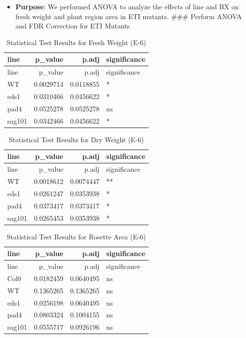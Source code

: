 \documentclass[
  10pt,
]{article}
\providecommand{\tightlist}{%
  \setlength{\itemsep}{0pt}\setlength{\parskip}{0pt}}\usepackage{longtable,booktabs,array}
\begin{document}
\begin{itemize}
\tightlist
\item
  \textbf{Purpose}: We performed ANOVA to analyze the effects of line
  and BX on fresh weight and plant region area in ETI mutants.
  \newpage \#\#\# Perform ANOVA and FDR Correction for ETI Mutants
\end{itemize}

\begin{longtable}[]{@{}lrrl@{}}
\caption{Statistical Test Results for Fresh Weight (E-6)}\tabularnewline
\toprule\noalign{}
line & p\_value & p.adj & significance \\
\midrule\noalign{}
\endfirsthead
\toprule\noalign{}
line & p\_value & p.adj & significance \\
\midrule\noalign{}
\endhead
\bottomrule\noalign{}
\endlastfoot
WT & 0.0029714 & 0.0118855 & * \\
eds1 & 0.0310466 & 0.0456622 & * \\
pad4 & 0.0525278 & 0.0525278 & ns \\
sag101 & 0.0342466 & 0.0456622 & * \\
\end{longtable}

\begin{longtable}[]{@{}lrrl@{}}
\caption{Statistical Test Results for Dry Weight (E-6)}\tabularnewline
\toprule\noalign{}
line & p\_value & p.adj & significance \\
\midrule\noalign{}
\endfirsthead
\toprule\noalign{}
line & p\_value & p.adj & significance \\
\midrule\noalign{}
\endhead
\bottomrule\noalign{}
\endlastfoot
WT & 0.0018612 & 0.0074447 & ** \\
eds1 & 0.0261247 & 0.0353938 & * \\
pad4 & 0.0373417 & 0.0373417 & * \\
sag101 & 0.0265453 & 0.0353938 & * \\
\end{longtable}

\begin{longtable}[]{@{}lrrl@{}}
\caption{Statistical Test Results for Rosette Area (E-6)}\tabularnewline
\toprule\noalign{}
line & p\_value & p.adj & significance \\
\midrule\noalign{}
\endfirsthead
\toprule\noalign{}
line & p\_value & p.adj & significance \\
\midrule\noalign{}
\endhead
\bottomrule\noalign{}
\endlastfoot
Col0 & 0.0182459 & 0.0640495 & ns \\
WT & 0.1365265 & 0.1365265 & ns \\
eds1 & 0.0256198 & 0.0640495 & ns \\
pad4 & 0.0803324 & 0.1004155 & ns \\
sag101 & 0.0555717 & 0.0926196 & ns \\
\end{longtable}
\end{document}
